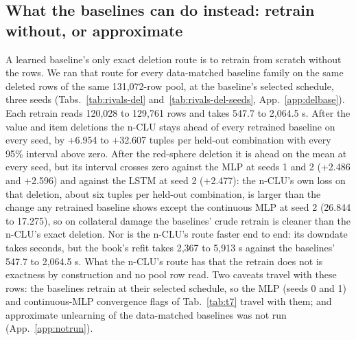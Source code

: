 \documentclass{article} %
\begin{document}
\subsection{What the baselines can do instead: retrain without, or approximate}
\label{sec:del-comparators}

A learned baseline's only exact deletion route is to retrain from scratch without the rows. We ran
that route for every data-matched baseline family on the same deleted rows of the same 131,072-row %
pool, at the baseline's selected schedule, three seeds (Tabs.~\ref{tab:rivals-del}
and~\ref{tab:rivals-del-seeds}, App.~\ref{app:delbase}). Each retrain reads 120,028 to 129,761 %
rows and takes 547.7 to 2,064.5 s. After the value and item deletions the n-CLU stays ahead of every %
retrained baseline on every seed, by +6.954 to +32.607 tuples per held-out combination with every 95\% interval above %
zero. After the red-sphere deletion it is ahead on the mean at every seed, but its interval crosses
zero against the MLP at seeds 1 and 2 (+2.486 and +2.596) and against the LSTM at seed 2 %
(+2.477): the n-CLU's own loss on that deletion, about six tuples per held-out combination, is larger than the %
change any retrained baseline shows except the continuous MLP at seed 2 (26.844 to 17.275), so on %
collateral damage the baselines' crude retrain is cleaner than the n-CLU's exact deletion. Nor is the
n-CLU's route faster end to end: its downdate takes seconds, but the book's refit takes 2,367 to %
5,913 s against the baselines' 547.7 to 2,064.5 s. What the n-CLU's route has that the retrain does not %
is exactness by construction and no pool row read. Two caveats travel with these rows: the baselines
retrain at their selected schedule, so the MLP (seeds 0 and 1) and continuous-MLP convergence flags
of Tab.~\ref{tab:t7} travel with them; and approximate unlearning of the data-matched baselines was not
run (App.~\ref{app:notrun}).
\end{document}
